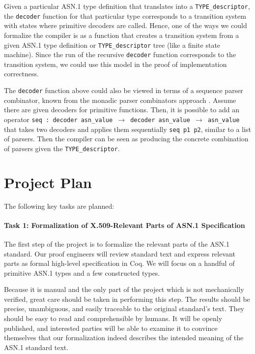 \documentclass[10p,conference]{IEEEtran}
\begin{document}
 Given a particular ASN.1 type definition that translates into a
 \texttt{TYPE\_descriptor}, the \texttt{decoder} function for that
 particular type corresponds to a transition system with states where
 primitive decoders are called. Hence, one of the ways we could
 formalize the compiler is as a function that creates a transition
 system from a given ASN.1 type definition or \texttt{TYPE\_descriptor} tree (like a finite state machine). Since the run of the
 recursive \texttt{decoder} function corresponds to the transition
 system, we could use this model in the proof of implementation
 correctness.

 The \texttt{decoder} function above could also be viewed in terms
 of a sequence parser combinator, known from the monadic parser combinators
 approach \cite{MPC}. Assume there are given decoders for primitive
 functions. Then, it is possible to add an operator \texttt{seq : decoder
   asn\_value $\rightarrow$ decoder asn\_value $\rightarrow$ asn\_value} that takes two
 decoders and applies them sequentially \texttt{seq p1 p2}, similar to a
 list of parsers. Then the compiler can be seen as producing the
 concrete combination of parsers given the \texttt{TYPE\_descriptor}.

 \section{Project Plan}
\label{plan}
The following key tasks are planned:
 
\paragraph{Task 1: Formalization of X.509-Relevant Parts of ASN.1 Specification}
The first step of the project is to formalize the relevant parts of the ASN.1 standard. Our proof engineers will review standard text and express relevant parts as formal high-level specification in Coq. We will focus on a handful of primitive ASN.1 types and a few constructed types.

Because it is manual and the only part of the project which is not mechanically verified, great care should be taken in performing this step. The results should be precise, unambiguous, and easily traceable to the original standard's text. They should be easy to read and comprehensible by humans. It will be openly published, and interested parties will be able to examine it to convince themselves that our formalization indeed describes the intended meaning of the ASN.1 standard text.
\end{document}
